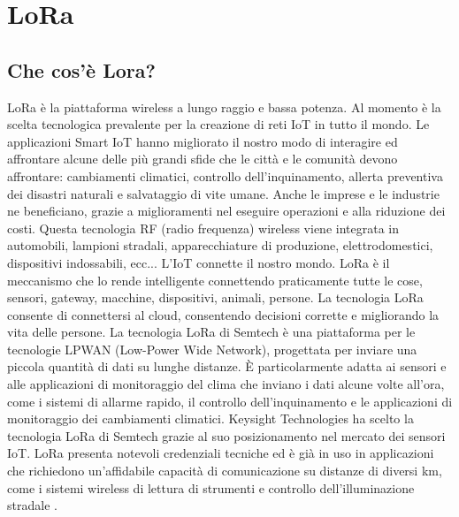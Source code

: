 \documentclass[a4paper]{report} %
\begin{document}
\section{LoRa}
\subsection{Che cos'è Lora?}
LoRa è la piattaforma wireless a lungo raggio e bassa potenza. Al momento è la scelta tecnologica prevalente per la creazione di reti IoT in tutto il mondo. Le applicazioni Smart IoT hanno migliorato il nostro modo di interagire ed affrontare alcune delle più grandi sfide che le città e le comunità devono affrontare: cambiamenti climatici, controllo dell'inquinamento, allerta preventiva dei disastri naturali e salvataggio di vite umane. Anche le imprese e le industrie ne beneficiano, grazie a miglioramenti nel eseguire operazioni e alla riduzione dei costi. Questa tecnologia RF (radio frequenza) wireless viene integrata in automobili, lampioni stradali, apparecchiature di produzione, elettrodomestici, dispositivi indossabili, ecc... L'IoT connette il nostro mondo. LoRa è il meccanismo che lo rende intelligente connettendo praticamente tutte le cose, sensori, gateway, macchine, dispositivi, animali, persone. La tecnologia LoRa consente di connettersi al cloud, consentendo decisioni corrette e migliorando la vita delle persone. La tecnologia LoRa di Semtech è una piattaforma per le tecnologie LPWAN (Low-Power Wide Network), progettata per inviare una piccola quantità di dati su lunghe distanze. È particolarmente adatta ai sensori e alle applicazioni di monitoraggio del clima che inviano i dati alcune volte all'ora, come i sistemi di allarme rapido, il controllo dell'inquinamento e le applicazioni di monitoraggio dei cambiamenti climatici. Keysight Technologies ha scelto la tecnologia LoRa di Semtech grazie al suo posizionamento nel mercato dei sensori IoT. LoRa presenta notevoli credenziali tecniche ed è già in uso in applicazioni che richiedono un'affidabile capacità di comunicazione su distanze di diversi km, come i sistemi wireless di lettura di strumenti e controllo dell'illuminazione stradale \cite{art:rif.24}.
\end{document}
